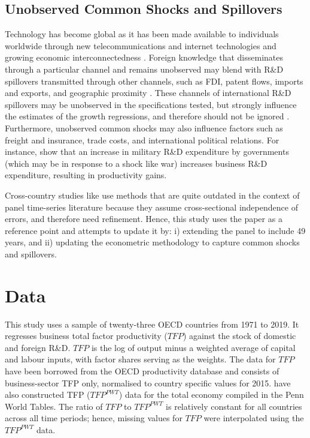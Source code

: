 \documentclass[12pt]{article}
\begin{document}
\subsection{Unobserved Common Shocks and Spillovers}

Technology has become global as it has been made available to individuals worldwide through new telecommunications and internet technologies and growing economic interconnectedness \citep{Keller2010}. Foreign knowledge that disseminates through a particular channel and remains unobserved may blend with R\&D spillovers transmitted through other channels, such as FDI, patent flows, imports and exports, and geographic proximity \citep{Lee2006, Keller2010}. These channels of international R\&D spillovers may be unobserved in the specifications tested, but strongly influence the estimates of the growth regressions, and therefore should not be ignored \citep{Eberhardt2013}. Furthermore, unobserved common shocks may also influence factors such as freight and insurance, trade costs, and international political relations. For instance, \citet{Moretti2023} show that an increase in military R\&D expenditure by governments (which may be in response to a shock like war) increases business R\&D expenditure, resulting in productivity gains. 

Cross-country studies like \citet{Coe2009} use methods that are quite outdated in the context of panel time-series literature because they assume cross-sectional independence of errors, and therefore need refinement. Hence, this study uses the \citet{Coe2009} paper as a reference point and attempts to update it by: i) extending the panel to include 49 years, and ii) updating the econometric methodology to capture common shocks and spillovers.
 
\section{Data}

This study uses a sample of twenty-three OECD countries from 1971 to 2019. It regresses business total factor productivity ($TFP$) against the stock of domestic and foreign R\&D. $TFP$ is the log of output minus a weighted average of capital and labour inputs, with factor shares serving as the weights. The data for $TFP$ have been borrowed from the OECD productivity database and consists of business-sector TFP only, normalised to country specific values for 2015. \citet{Feenstra2015} have also constructed TFP ($TFP^{PWT}$) data for the total economy compiled in the Penn World Tables. The ratio of $TFP$ to $TFP^{PWT}$ is relatively constant for all countries across all time periods; hence, missing values for $TFP$ were interpolated using the $TFP^{PWT}$ data.
\end{document}

